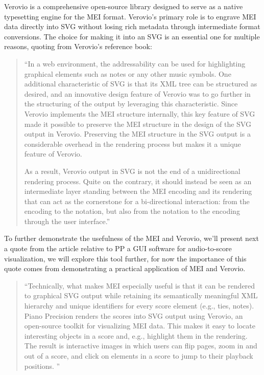 Verovio is a comprehensive open-source library designed to serve as a native typesetting engine for the \ac{MEI} format. Verovio's primary role is to engrave \ac{MEI} data directly into \ac{SVG} without losing rich metadata through intermediate format conversions. The choice for making it into an \ac{SVG} is an essential one for multiple reasons, quoting from Verovio's reference book:

\begin{quote}
``In a web environment, the addressability can be used for highlighting graphical elements such as notes or any other music symbols. One additional characteristic of SVG is that its XML tree can be structured as desired, and an innovative design feature of Verovio was to go further in the structuring of the output by leveraging this characteristic. Since Verovio implements the MEI structure internally, this key feature of SVG made it possible to preserve the MEI structure in the design of the SVG output in Verovio. Preserving the MEI structure in the SVG output is a considerable overhead in the rendering process but makes it a unique feature of Verovio.

As a result, Verovio output in SVG is not the end of a unidirectional rendering process. Quite on the contrary, it should instead be seen as an intermediate layer standing between the MEI encoding and its rendering that can act as the cornerstone for a bi-directional interaction: from the encoding to the notation, but also from the notation to the encoding through the user interface.''  \cite{repertoireinternationaldessourcesmusicalesVerovioReferenceBook2021}
\end{quote} 

To further demonstrate the usefulness of the MEI and Verovio, we'll present next a quote from the article relative to \ac{PP} a \ac{GUI} software for audio-to-score visualization, we will explore this tool further, for now the importance of this quote comes from demonstrating a practical application of \ac{MEI} and Verovio.

\begin{quotation}
``Technically, what makes MEI especially useful is that it can be rendered to graphical SVG output while retaining its semantically meaningful XML hierarchy and unique identifiers for every score element (e.g., ties, notes). Piano Precision renders the scores into SVG output using Verovio, an open-source toolkit for visualizing MEI data. This makes it easy to locate interesting objects in a score and, e.g., highlight them in the rendering. The result is interactive images in which users can flip pages, zoom in and out of a score, and click on elements in a score to jump to their playback positions. '' \cite{jiangPIANOPRECISIONADVANCING2025}
\end{quotation}

